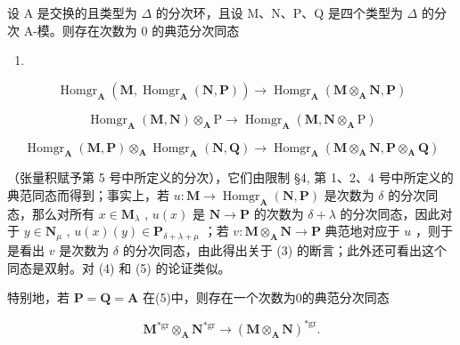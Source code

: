 设 A 是交换的且类型为 \(\Delta\) 的分次环，且设 M、N、P、Q 是四个类型为 \(\Delta\) 的分次 A-模。则存在次数为 0 的典范分次同态

\begin{enumerate}
\def\labelenumi{(\arabic{enumi})}
\setcounter{enumi}{2}
\tightlist
\item
\end{enumerate}

\[
\operatorname{Homgr} _ {\mathbf {A}} (\mathbf {M}, \operatorname{Homgr} _ {\mathbf {A}} (\mathbf {N}, \mathbf {P})) \rightarrow \operatorname{Homgr} _ {\mathbf {A}} (\mathbf {M} \otimes_ {\mathbf {A}} \mathbf {N}, \mathbf {P})\tag{4}
\]

\[
\operatorname{Homgr} _ {\mathbf {A}} (\mathbf {M}, \mathbf {N}) \otimes_ {\mathbf {A}} \mathrm{P} \rightarrow \operatorname{Homgr} _ {\mathbf {A}} (\mathbf {M}, \mathbf {N} \otimes_ {\mathbf {A}} \mathrm{P})
\]

\[
\operatorname{Homgr} _ {\mathbf {A}} (\mathbf {M}, \mathbf {P}) \otimes_ {\mathbf {A}} \operatorname{Homgr} _ {\mathbf {A}} (\mathbf {N}, \mathbf {Q}) \rightarrow \operatorname{Homgr} _ {\mathbf {A}} (\mathbf {M} \otimes_ {\mathbf {A}} \mathbf {N}, \mathbf {P} \otimes_ {\mathbf {A}} \mathbf {Q}) \tag {5}
\]

（张量积赋予第 5 号中所定义的分次），它们由限制 §4, 第 1、2、4 号中所定义的典范同态而得到；事实上，若 \(u: \mathbf{M} \to \operatorname{Homgr}_{\mathbf{A}}(\mathbf{N}, \mathbf{P})\) 是次数为 \(\delta\) 的分次同态，那么对所有 \(x \in \mathbf{M}_{\lambda}\) , \(u(x)\) 是 \(\mathbf{N} \to \mathbf{P}\) 的次数为 \(\delta + \lambda\) 的分次同态，因此对于 \(y \in \mathbf{N}_{\mu}\) , \(u(x)(y) \in \mathbf{P}_{\delta + \lambda + \mu}\) ；若 \(v: \mathbf{M} \otimes_{\mathbf{A}} \mathbf{N} \to \mathbf{P}\) 典范地对应于 \(u\) ，则于是看出 \(v\) 是次数为 \(\delta\) 的分次同态，由此得出关于 (3) 的断言；此外还可看出这个同态是双射。对 (4) 和 (5) 的论证类似。

特别地，若 \(\mathbf{P} = \mathbf{Q} = \mathbf{A}\) 在(5)中，则存在一个次数为0的典范分次同态

\[
\mathbf {M} ^ {* \mathrm{gr}} \otimes_ {\mathbf {A}} \mathbf {N} ^ {* \mathrm{gr}} \rightarrow (\mathbf {M} \otimes_ {\mathbf {A}} \mathbf {N}) ^ {* \mathrm{gr}}.\tag{6}
\]

